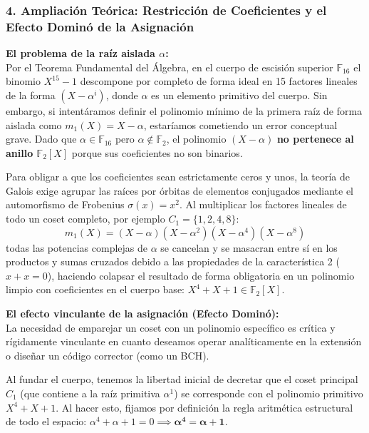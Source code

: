 \documentclass{article}
\begin{document}
\subsubsection{4. Ampliación Teórica: Restricción de Coeficientes y el Efecto Dominó de la Asignación}

\textbf{El problema de la raíz aislada \texorpdfstring{$\alpha$}{alpha}:}\\
Por el Teorema Fundamental del Álgebra, en el cuerpo de escisión superior $\mathbb{F}_{16}$ el binomio $X^{15}-1$ descompone por completo de forma ideal en 15 factores lineales de la forma $(X - \alpha^i)$, donde $\alpha$ es un elemento primitivo del cuerpo. Sin embargo, si intentáramos definir el polinomio mínimo de la primera raíz de forma aislada como $m_1(X) = X - \alpha$, estaríamos cometiendo un error conceptual grave. Dado que $\alpha \in \mathbb{F}_{16}$ pero $\alpha \notin \mathbb{F}_2$, el polinomio $(X - \alpha)$ \textbf{no pertenece al anillo $\mathbb{F}_2[X]$} porque sus coeficientes no son binarios. 

Para obligar a que los coeficientes sean estrictamente ceros y unos, la teoría de Galois exige agrupar las raíces por órbitas de elementos conjugados mediante el automorfismo de Frobenius $\sigma(x) = x^2$. Al multiplicar los factores lineales de todo un coset completo, por ejemplo $C_1 = \{1, 2, 4, 8\}$:
\[ m_1(X) = (X - \alpha)(X - \alpha^2)(X - \alpha^4)(X - \alpha^8) \]
todas las potencias complejas de $\alpha$ se cancelan y se masacran entre sí en los productos y sumas cruzados debido a las propiedades de la característica 2 ($x+x=0$), haciendo colapsar el resultado de forma obligatoria en un polinomio limpio con coeficientes en el cuerpo base: $X^4 + X + 1 \in \mathbb{F}_2[X]$.

\textbf{El efecto vinculante de la asignación (Efecto Dominó):}\\
La necesidad de emparejar un coset con un polinomio específico es crítica y rígidamente vinculante en cuanto deseamos operar analíticamente en la extensión o diseñar un código corrector (como un BCH). 

Al fundar el cuerpo, tenemos la libertad inicial de decretar que el coset principal $C_1$ (que contiene a la raíz primitiva $\alpha^1$) se corresponde con el polinomio primitivo $X^4 + X + 1$. Al hacer esto, fijamos por definición la regla aritmética estructural de todo el espacio: $\alpha^4 + \alpha + 1 = 0 \implies \mathbf{\alpha^4 = \alpha + 1}$. 
\end{document}
